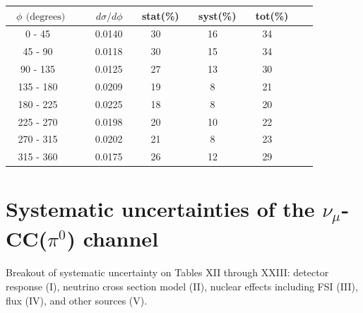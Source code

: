 \documentclass[aps, prd, reprint,showpacs,  preprintnumbers,amsmath,amssymb,superscriptaddress, nofootinbib]{revtex4-1}
\makeatletter
\newcommand{\numu}{\mbox{$\nu_{\mu}$}}                   %
\renewenvironment{table}
  {\def\@captype{table}}
  {}
\makeatother
\begin{document}
\begin{table}
\centering
\begin{tabular}{crccccc}
\hline
~$\phi$ $\text{(degrees)}$ &~~~ $d\sigma/d\phi$ &~ stat(\%) &~ syst(\%) &~ tot(\%)  \\
\hline
        0 - 45 & 0.0140 &   30 &   16 &   34 \\
       45 - 90 & 0.0118 &   30 &   15 &   34 \\
      90 - 135 & 0.0125 &   27 &   13 &   30 \\
     135 - 180 & 0.0209 &   19 &    8 &   21 \\
     180 - 225 & 0.0225 &   18 &    8 &   20 \\
     225 - 270 & 0.0198 &   20 &   10 &   22 \\
     270 - 315 & 0.0202 &   21 &    8 &   23 \\
     315 - 360 & 0.0175 &   26 &   12 &   29 \\
\hline\hline
\end{tabular}
\caption{ Flux-averaged differential cross section in $\phi$, the $\pi^{0}$ azimuthal angle in the $p\pi^{0}$ rest frame: 
$d\sigma/d\phi (10^{-40}\text{cm}^2/\text{nucleon}/(\text{degree}))$, for $\pi^0$+nucleon(s) production with statistical (stat), systematic (syst), and total (tot) uncertainties. NOTE: Result is for the $\Delta$-enriched subsample with $T_{p}>100$\,MeV and $W<1.4$\,GeV.}
\label{tb:piz-azimuth}
\end{table}



\onecolumngrid
\section{Systematic uncertainties of the $\numu$-CC($\pi^{0}$) channel}


Breakout of systematic uncertainty on Tables XII through XXIII: detector response (I), 
neutrino cross section model (II), nuclear effects including FSI (III), flux (IV), and other sources (V). 
\end{document}

